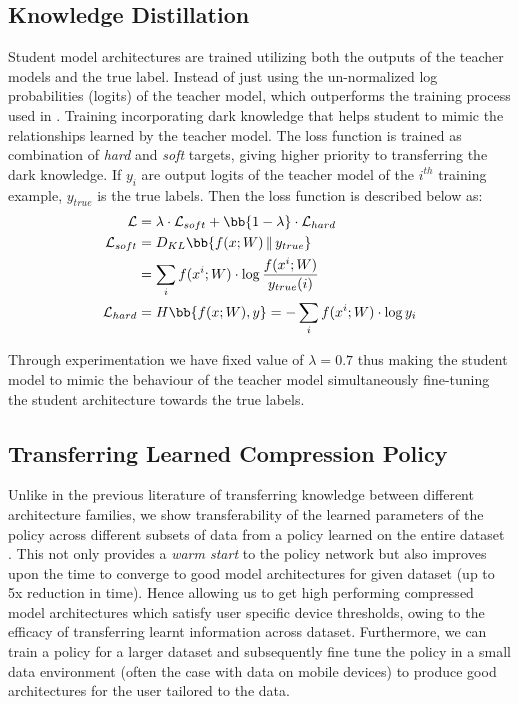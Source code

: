 \documentclass[../main]{subfiles}
\begin{document}
    \subsection{Knowledge Distillation}
    \label{sec:KD}
        Student model architectures are trained utilizing both the outputs of the teacher models and the true label.
        Instead of just using the un-normalized log probabilities (logits) of the teacher model, which outperforms the training process used in \cite{ashok2017n2n}.
        Training incorporating dark knowledge \cite{hinton2015distilling} that helps student to mimic the relationships learned by the teacher model.
        The loss function is trained as combination of \textit{hard} and \textit{soft} targets, giving higher  priority to transferring the dark knowledge.
        If $y_{i}$ are output logits of the teacher model of the $i^{th}$ training example, $y_{true}$ is the true labels.
        Then the loss function is described below as:
        \begin{align}
            \mathcal{L} & = \lambda\cdot\mathcal{L}_{soft} + \bb{1-\lambda}\cdot\mathcal{L}_{hard}   \\
            \mathcal{L}_{soft} & = D_{KL}\bb{f(x; W) \,\Vert\, y_{true}}    \notag \\
            & = \sum_{i} f(x^{i}; W) \cdot \log\frac{f(x^{i}; W)}{y_{true}(i)}   \\
            \mathcal{L}_{hard} & = H\bb{f(x; W), y} = - \sum_{i} f(x^{i}; W) \cdot \log{y_{i}}
        \end{align}
        
        Through experimentation we have fixed value of $\lambda = 0.7$ thus making the student model to mimic the behaviour of the teacher model simultaneously fine-tuning the student architecture towards the true labels.

    \subsection{Transferring Learned Compression Policy}
    \label{sec:TL}
        Unlike in the previous literature \cite{zoph2017learning, zoph2016neural} of transferring knowledge between different architecture families, we show transferability of the learned parameters of the policy across different subsets of data from a policy learned on the entire dataset .
        This not only provides a \textit{warm start} to the policy network but also improves upon the time to converge to good model architectures for given dataset (up to 5x reduction in time).
        Hence allowing us to get high performing compressed model architectures which satisfy user specific device thresholds, owing to the efficacy of transferring learnt information across dataset.
        Furthermore, we can train a policy for a larger dataset and subsequently fine tune the policy in a small data environment (often the case with data on mobile devices) to produce good architectures for the user tailored to the data.

\end{document}
